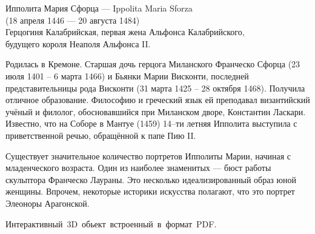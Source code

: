 \newpage
{}

\noindent
\hspace{70pt}
\parbox{320pt}{%
\begin{center}
Ипполита Мария Сфорца --- Ippolita Maria Sforza\\
(18 апреля 1446 — 20 августа 1484)\\
Герцогиня Калабрийская, первая жена
Альфонса Калабрийского,\\
будущего короля Неаполя Альфонса II.
\end{center}
}
\vglue 10pt
\noindent
\hspace{60pt}
\parbox{190pt}{%
Родилась в Кремоне. Старшая дочь герцога Миланского Франческо Сфорца
(23 июля 1401 -- 6 марта 1466) и Бьянки Марии Висконти, последней
представительницы рода Висконти (31 марта 1425 -- 28 октября 1468).
Получила отличное образование. Философию и греческий язык ей преподавал
византийский учёный и филолог, обосновавшийся при Миланском дворе,
Константин Ласкари. Известно, что на Соборе в Мантуе (1459) 14--ти
летняя Ипполита выступила с приветственной речью, обращённой к папе Пию II.}
\hspace{2pt}
\parbox{150pt}{%
\label{ex3d}
}
\mbox{}\par
\vglue 5pt
\noindent
\hspace{60pt}
\parbox{340pt}{%
\scriptsize{
Существует значительное количество портретов Ипполиты Марии, начиная
с младенческого возраста. Один из наиболее знаменитых --- бюст работы
скульптора Франческо Лаураны. Это несколько идеализированный образ
юной женщины. Впрочем, некоторые историки искусства полагают,
что это портрет Элеоноры Арагонской.}}
\begin{center}
\hspace{50pt}\mbox{\tiny{Интерактивный 3D обьект встроенный в формат PDF}.}
\end{center}
